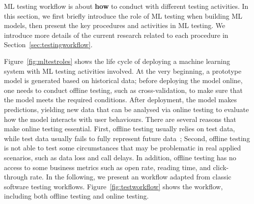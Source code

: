 \label{sec:mltestingworkflow}
ML testing workflow is about \textbf{how} to conduct \mlt{} with different testing activities. 
In this section, we first briefly introduce the role of ML testing when building ML models,
then present the key procedures and activities in ML testing.
We introduce more details of the current research related to each procedure in Section~\ref{sec:testingworkflow}.

Figure~\ref{fig:mltestroles} shows the life cycle of deploying a machine learning system with ML testing activities involved.
At the very beginning, a prototype model is generated based on historical data;
before deploying the model online, one needs to conduct offline testing, such as cross-validation, to make sure that the model meets the required conditions.
After deployment, the model makes predictions, yielding new data that can be analysed via online testing to evaluate how the model interacts with user behaviours.
There are several reasons that make online testing essential.
First, offline testing usually relies on test data, while test data usually fails to fully represent future data~;
Second, offline testing is not able to test some circumstances that may be problematic in real applied scenarios, such as data loss and call delays.
In addition, offline testing has no access to some business metrics such as open rate, reading time, and click-through rate.
In the following, we present an \mlt{} workflow adapted from classic software testing workflows.
Figure~\ref{fig:testworkflow} shows the workflow, including both offline testing and online testing.

